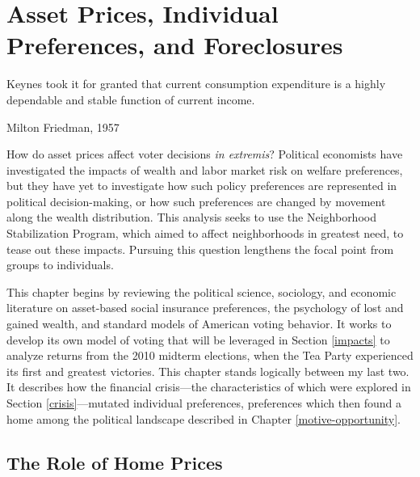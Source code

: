 \documentclass[12pt,oneside]{psthesis}
\begin{document}
\hypertarget{methods}{%
\chapter{Asset Prices, Individual Preferences, and Foreclosures}\label{methods}}

\epigraph{Keynes took it for granted that current consumption expenditure is a highly dependable and stable function of current income.}{Milton Friedman, 1957}

How do asset prices affect voter decisions \emph{in extremis}?
Political economists have investigated the impacts of wealth and labor market risk on welfare preferences, but they have yet to investigate how such policy preferences are represented in political decision-making, or how such preferences are changed by movement along the wealth distribution.
This analysis seeks to use the Neighborhood Stabilization Program, which aimed to affect neighborhoods in greatest need, to tease out these impacts.
Pursuing this question lengthens the focal point from groups to individuals.

This chapter begins by reviewing the political science, sociology, and economic literature on asset-based social insurance preferences, the psychology of lost and gained wealth, and standard models of American voting behavior.
It works to develop its own model of voting that will be leveraged in Section \ref{impacts} to analyze returns from the 2010 midterm elections, when the Tea Party experienced its first and greatest victories.
This chapter stands logically between my last two.
It describes how the financial crisis---the characteristics of which were explored in Section \ref{crisis}---mutated individual preferences, preferences which then found a home among the political landscape described in Chapter \ref{motive-opportunity}.

\hypertarget{home-prices}{%
\section{The Role of Home Prices}\label{home-prices}}
\end{document}
